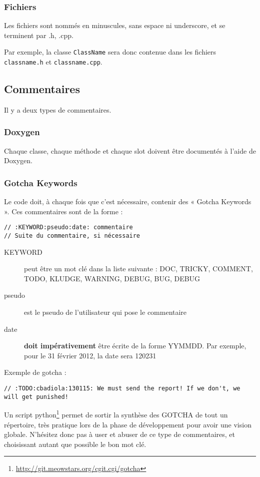 \subsubsection{Fichiers}

Les fichiers sont nommés en minuscules, sans espace ni underscore, et se terminent par .h, .cpp.

Par exemple, la classe \verb+ClassName+ sera donc contenue dans les fichiers \verb+classname.h+ et \verb+classname.cpp+. 

\subsection{Commentaires}

Il y a deux types de commentaires.

\subsubsection{Doxygen}

Chaque classe, chaque méthode et chaque slot doivent être documentés à l'aide de Doxygen. 

\subsubsection{Gotcha Keywords}

Le code doit, à chaque fois que c'est nécessaire, contenir des « Gotcha Keywords ». Ces commentaires sont de la forme :
\begin{verbatim}
// :KEYWORD:pseudo:date: commentaire
// Suite du commentaire, si nécessaire
\end{verbatim}

\begin{description}
  \item[KEYWORD] peut être un mot clé dans la liste suivante : DOC, TRICKY, COMMENT, TODO, KLUDGE, WARNING, DEBUG, BUG, DEBUG
  \item[pseudo] est le pseudo de l'utilisateur qui pose le commentaire
  \item[date] \textbf{doit impérativement} être écrite de la forme YYMMDD. Par exemple, pour le 31 février 2012, la date sera 120231
\end{description}

Exemple de gotcha : 
\begin{verbatim}
// :TODO:cbadiola:130115: We must send the report! If we don't, we will get punished!
\end{verbatim}

Un script python\footnote{\url{http://git.meowstars.org/cgit.cgi/gotcha}} permet de sortir la synthèse des GOTCHA de tout un répertoire, très pratique lors de la phase de développement pour avoir une vision globale. N'hésitez donc pas à user et abuser de ce type de commentaires, et choisissant autant que possible le bon mot clé. 
